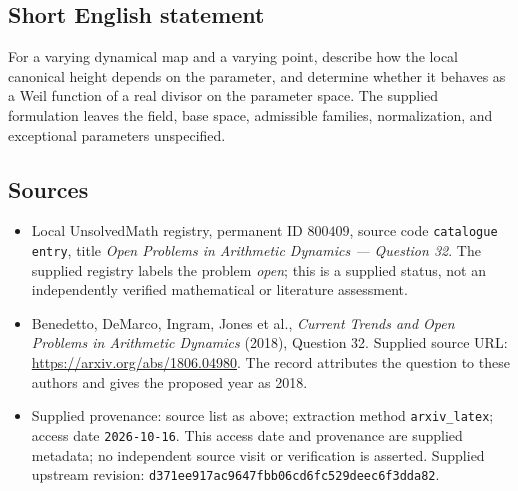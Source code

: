 \documentclass[11pt]{article}
\begin{document}
\subsection{Short English statement}
For a varying dynamical map and a varying point, describe how the local canonical height depends on the parameter, and determine whether it behaves as a Weil function of a real divisor on the parameter space. The supplied formulation leaves the field, base space, admissible families, normalization, and exceptional parameters unspecified.
\subsection{Sources}
\begin{itemize}
\item Local UnsolvedMath registry, permanent ID \(800409\), source code \texttt{catalogue entry}, title \emph{Open Problems in Arithmetic Dynamics --- Question 32}. The supplied registry labels the problem \emph{open}; this is a supplied status, not an independently verified mathematical or literature assessment.
\item Benedetto, DeMarco, Ingram, Jones et al., \emph{Current Trends and Open Problems in Arithmetic Dynamics} (2018), Question 32. Supplied source URL: \url{https://arxiv.org/abs/1806.04980}. The record attributes the question to these authors and gives the proposed year as 2018.
\item Supplied provenance: source list as above; extraction method \texttt{arxiv\_latex}; access date \texttt{2026-10-16}. This access date and provenance are supplied metadata; no independent source visit or verification is asserted. Supplied upstream revision: \texttt{d371ee917ac9647fbb06cd6fc529deec6f3dda82}.
\end{itemize}
\end{document}
